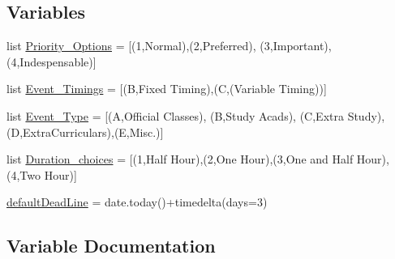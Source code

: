 \subsection*{Variables}
\begin{DoxyCompactItemize}
\item 
list \hyperlink{namespaceTimetable_1_1models_ae489395ae15eda99e8373dca59056f53}{Priority\+\_\+\+Options} = \mbox{[}(\textquotesingle{}1\textquotesingle{},\textquotesingle{}Normal\textquotesingle{}),(\textquotesingle{}2\textquotesingle{},\textquotesingle{}Preferred\textquotesingle{}), (\textquotesingle{}3\textquotesingle{},\textquotesingle{}Important\textquotesingle{}), (\textquotesingle{}4\textquotesingle{},\textquotesingle{}Indespensable\textquotesingle{})\mbox{]}
\item 
list \hyperlink{namespaceTimetable_1_1models_aed6c941f263e653fcb4c0da06577c61b}{Event\+\_\+\+Timings} = \mbox{[}(\textquotesingle{}B\textquotesingle{},\textquotesingle{}Fixed Timing\textquotesingle{}),(\textquotesingle{}C\textquotesingle{},(\textquotesingle{}Variable Timing\textquotesingle{}))\mbox{]}
\item 
list \hyperlink{namespaceTimetable_1_1models_a01707f5f0bae6a240a4d4c255d0c9306}{Event\+\_\+\+Type} = \mbox{[}(\textquotesingle{}A\textquotesingle{},\textquotesingle{}Official Classes\textquotesingle{}), (\textquotesingle{}B\textquotesingle{},\textquotesingle{}Study Acads\textquotesingle{}), (\textquotesingle{}C\textquotesingle{},\textquotesingle{}Extra Study\textquotesingle{}), (\textquotesingle{}D\textquotesingle{},\textquotesingle{}Extra\+Curriculars\textquotesingle{}),(\textquotesingle{}E\textquotesingle{},\textquotesingle{}Misc.\textquotesingle{})\mbox{]}
\item 
list \hyperlink{namespaceTimetable_1_1models_a3de5e5d97c7dbbfd08e212b9d1ad3ec5}{Duration\+\_\+choices} = \mbox{[}(\textquotesingle{}1\textquotesingle{},\textquotesingle{}Half Hour\textquotesingle{}),(\textquotesingle{}2\textquotesingle{},\textquotesingle{}One Hour\textquotesingle{}),(\textquotesingle{}3\textquotesingle{},\textquotesingle{}One and Half Hour\textquotesingle{}),(\textquotesingle{}4\textquotesingle{},\textquotesingle{}Two Hour\textquotesingle{})\mbox{]}
\item 
\hyperlink{namespaceTimetable_1_1models_a6b1be2b87de430a3f0820a4908c608fd}{default\+Dead\+Line} = date.\+today()+timedelta(days=3)
\end{DoxyCompactItemize}


\subsection{Variable Documentation}
